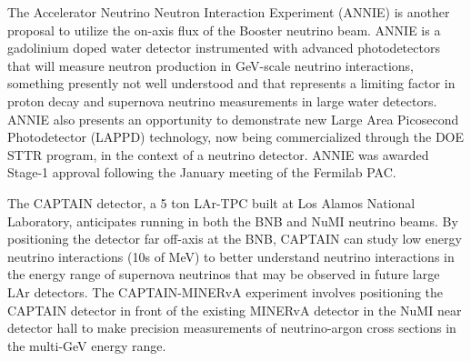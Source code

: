 The Accelerator Neutrino Neutron Interaction Experiment (ANNIE) is another proposal to utilize the on-axis flux of the Booster neutrino beam.  ANNIE is a gadolinium doped water detector instrumented with advanced photodetectors that will measure neutron production in GeV-scale neutrino interactions, something presently not well understood and that represents a limiting factor in proton decay and supernova neutrino measurements in large water detectors.  ANNIE also presents an opportunity to demonstrate new Large Area Picosecond Photodetector (LAPPD) technology, now being commercialized through the DOE STTR program, in the context of a neutrino detector. ANNIE was awarded Stage-1 approval following the January meeting of the Fermilab PAC.


The CAPTAIN detector, a 5 ton LAr-TPC built at Los Alamos National Laboratory, anticipates running in both the BNB and NuMI neutrino beams.  By positioning the detector far off-axis at the BNB, CAPTAIN can study low energy neutrino interactions (10s of MeV) to better understand neutrino interactions in the energy range of supernova neutrinos that may be observed in future large LAr detectors.  The CAPTAIN-MINERvA experiment involves positioning the CAPTAIN detector in front of the existing MINERvA detector in the NuMI near detector hall to make precision measurements of neutrino-argon cross sections in the multi-GeV energy range.      


